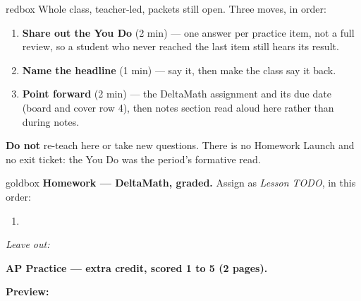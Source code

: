 \documentclass[10pt]{article}
\begin{document}
\boxguard[20]
\begin{skillbox}{redbox}
Whole class, teacher-led, packets still open. Three moves, in order:
\begin{enumerate}[itemsep=3pt]
  \item \textbf{Share out the You Do} (2 min) --- one answer per practice item,
        not a full review, so a student who never reached the last item still
        hears its result.
  \item \textbf{Name the headline} (1 min) --- say it, then make the class say it
        back. %
  \item \textbf{Point forward} (2 min) --- the DeltaMath assignment and its due
        date (board and cover row 4), then %
        notes section read aloud here rather than during notes.
\end{enumerate}
\textbf{Do not} re-teach here or take new questions. There is no Homework Launch
and no exit ticket: the You Do was the period's formative read.
\end{skillbox}

\begin{skillbox}{goldbox}
\textbf{Homework --- DeltaMath, graded.} Assign as \textit{Lesson TODO}, in this order:
\begin{enumerate}[itemsep=1pt,topsep=2pt]
  \item %
\end{enumerate}
\textit{Leave out:} %

\textbf{AP Practice --- extra credit, scored 1 to 5 (2 pages).} %

\textbf{Preview:} %
\end{skillbox}

\begin{teachernote}[Warm-Up]
\end{teachernote}
\end{document}

